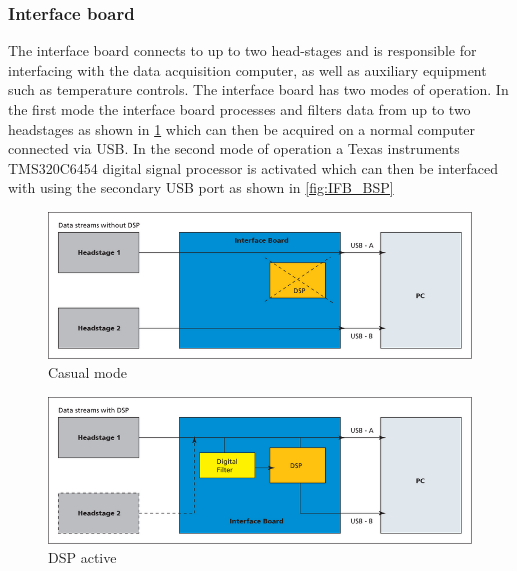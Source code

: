 \subsubsection{Interface board}
The interface board connects to up to two head-stages and is responsible for interfacing
with the data acquisition computer, as well as auxiliary equipment such as temperature
controls.
The interface board has two modes of operation.
In the first mode the interface board processes and filters data from up to two
headstages as shown in \ref{fig:IFB_regular} which can then be acquired on a normal
computer connected via USB.
In the second mode of operation a Texas instruments TMS320C6454 digital signal
processor is activated which can then be interfaced with using the secondary USB
port as shown in \ref{fig:IFB_BSP}
\begin{figure}[h!]
    \includegraphics[width=\linewidth]{images/regular_operation.png}
    \caption{Casual mode}
    \label{fig:IFB_regular}
\end{figure}
\begin{figure}[h!]
    \includegraphics[width=\linewidth]{images/dsp_operation.png}
    \caption{DSP active}
    \label{fig:IFB_DSP}
\end{figure}

